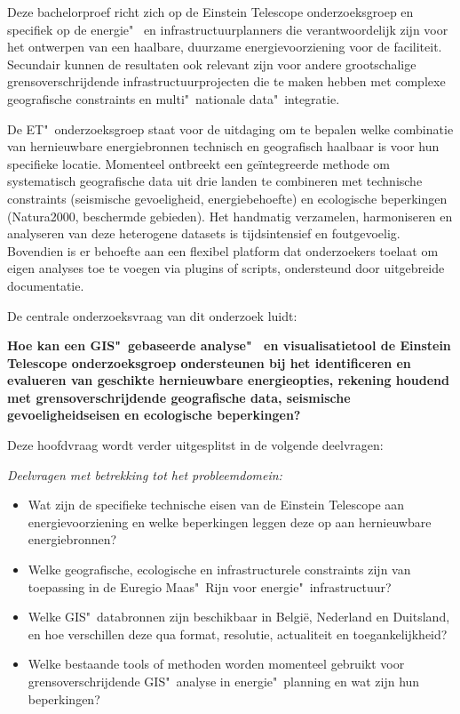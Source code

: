 Deze bachelorproef richt zich op de Einstein Telescope onderzoeksgroep en specifiek op de energie"~ en infrastructuurplanners die verantwoordelijk zijn voor het ontwerpen van een haalbare, duurzame energievoorziening voor de faciliteit. Secundair kunnen de resultaten ook relevant zijn voor andere grootschalige grensoverschrijdende infrastructuurprojecten die te maken hebben met complexe geografische constraints en multi"~nationale data"~integratie.

De ET"~onderzoeksgroep staat voor de uitdaging om te bepalen welke combinatie van hernieuwbare energiebronnen technisch en geografisch haalbaar is voor hun specifieke locatie. Momenteel ontbreekt een geïntegreerde methode om systematisch geografische data uit drie landen te combineren met technische constraints (seismische gevoeligheid, energiebehoefte) en ecologische beperkingen (Natura2000, beschermde gebieden). Het handmatig verzamelen, harmoniseren en analyseren van deze heterogene datasets is tijdsintensief en foutgevoelig. Bovendien is er behoefte aan een flexibel platform dat onderzoekers toelaat om eigen analyses toe te voegen via plugins of scripts, ondersteund door uitgebreide documentatie.

De centrale onderzoeksvraag van dit onderzoek luidt: 

\textbf{Hoe kan een GIS"~gebaseerde analyse"~ en visualisatietool de Einstein Telescope onderzoeksgroep ondersteunen bij het identificeren en evalueren van geschikte hernieuwbare energieopties, rekening houdend met grensoverschrijdende geografische data, seismische gevoeligheidseisen en ecologische beperkingen?}

Deze hoofdvraag wordt verder uitgesplitst in de volgende deelvragen:

\textit{Deelvragen met betrekking tot het probleemdomein:}
\begin{itemize}
    \item Wat zijn de specifieke technische eisen van de Einstein Telescope aan energievoorziening en welke beperkingen leggen deze op aan hernieuwbare energiebronnen?
    \item Welke geografische, ecologische en infrastructurele constraints zijn van toepassing in de Euregio Maas"~Rijn voor energie"~infrastructuur?
    \item Welke GIS"~databronnen zijn beschikbaar in België, Nederland en Duitsland, en hoe verschillen deze qua format, resolutie, actualiteit en toegankelijkheid?
    \item Welke bestaande tools of methoden worden momenteel gebruikt voor grensoverschrijdende GIS"~analyse in energie"~planning en wat zijn hun beperkingen?
\end{itemize}

